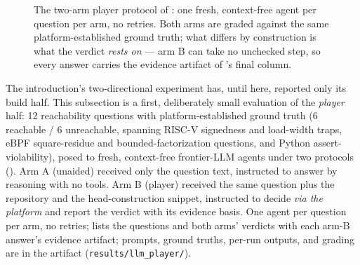 \begin{figure}
\centering
{}
\caption{The two-arm player protocol of : one fresh,
context-free agent per question per arm, no retries. Both arms are
graded against the same platform-established ground truth; what
differs by construction is what the verdict \emph{rests on} --- arm B
can take no unchecked step, so every answer carries the evidence
artifact of 's final column.}
\label{fig:player}
\end{figure}

The introduction's two-directional experiment has, until here, reported
only its build half. This subsection is a first, deliberately small
evaluation of the \emph{player} half: 12 reachability questions with
platform-established ground truth (6 reachable / 6 unreachable, spanning
RISC-V signedness and load-width traps, eBPF square-residue and
bounded-factorization questions, and Python assert-violability), posed
to fresh, context-free frontier-LLM agents under two protocols
(). Arm A
(unaided) received only the question text, instructed to answer by
reasoning with no tools. Arm B (player) received the same question plus
the repository and the head-construction snippet, instructed to decide
\emph{via the platform} and report the verdict with its evidence basis.
One agent per question per arm, no retries;  lists the
questions and both arms' verdicts with each arm-B answer's evidence
artifact; prompts, ground truths,
per-run outputs, and grading are in the artifact
(\texttt{results/llm\_player/}).

